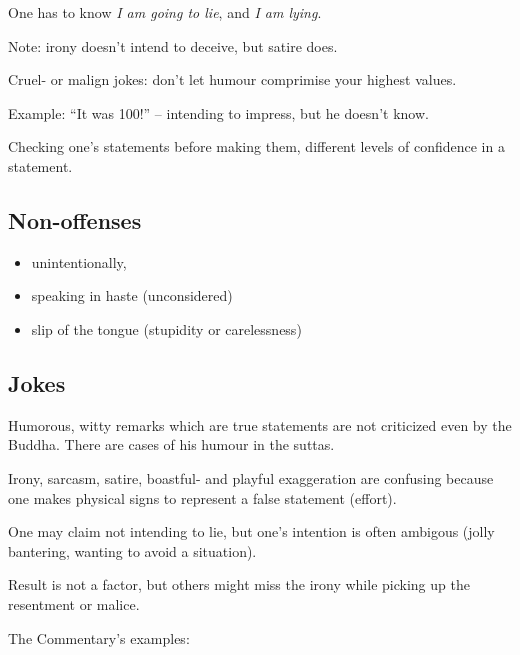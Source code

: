 One has to know \emph{I am going to lie}, and \emph{I am lying}.

Note: irony doesn't intend to deceive, but satire does.

Cruel- or malign jokes: don't let humour comprimise your highest values.

Example: ``It was 100!'' -- intending to impress, but he doesn't know.

Checking one's statements before making them, different levels of
confidence in a statement.

%
%

\subsection{Non-offenses}

\begin{itemize}
\tightlist
\item
  unintentionally,
\item
  speaking in haste (unconsidered)
\item
  slip of the tongue (stupidity or carelessness)
\end{itemize}

\clearpage

\subsection{Jokes}

Humorous, witty remarks which are true statements are not criticized
even by the Buddha. There are cases of his humour in the suttas.

Irony, sarcasm, satire, boastful- and playful exaggeration are confusing
because one makes physical signs to represent a false statement
(effort).

One may claim not intending to lie, but one's intention is often
ambigous (jolly bantering, wanting to avoid a situation).

Result is not a factor, but others might miss the irony while picking up
the resentment or malice.

The Commentary's examples:

